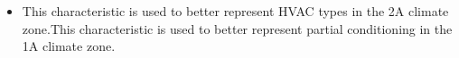 \begin{itemize}
\item This characteristic is used to better represent HVAC types in the 2A climate zone.This characteristic is used to better represent partial conditioning in the 1A climate zone.
\end{itemize}
